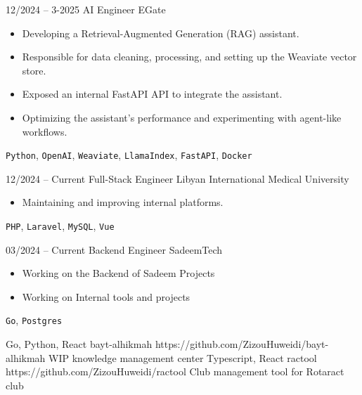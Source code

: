 \documentclass[9pt]{developercv} %
\begin{document}
\begin{entrylist}
    \entry
    {12/2024 -- 3-2025}
    {AI Engineer}
    {EGate}
    {\vspace{-10pt}
        \begin{itemize}[noitemsep,topsep=0pt,parsep=0pt,partopsep=0pt,leftmargin=-1pt]
            \item Developing a Retrieval-Augmented Generation (RAG) assistant.
            \item Responsible for data cleaning, processing, and setting up the Weaviate vector store.
            \item Exposed an internal FastAPI API to integrate the assistant.
            \item Optimizing the assistant's performance and experimenting with agent-like workflows.
        \end{itemize}
      \texttt{Python}, \texttt{OpenAI}, \texttt{Weaviate}, \texttt{LlamaIndex}, \texttt{FastAPI}, \texttt{Docker}}
        
    \entry
    {12/2024 -- Current}
    {Full-Stack Engineer}
    {Libyan International Medical University}
    {\vspace{-10pt}
        \begin{itemize}[noitemsep,topsep=0pt,parsep=0pt,partopsep=0pt,leftmargin=-1pt]
            \item Maintaining and improving internal platforms.
        \end{itemize}
        \texttt{PHP}, \texttt{Laravel}, \texttt{MySQL}, \texttt{Vue}}
    \entry
    {03/2024 -- Current}
    {Backend Engineer}
    {SadeemTech}
    {\vspace{-10pt}
        \begin{itemize}[noitemsep,topsep=0pt,parsep=0pt,partopsep=0pt,leftmargin=-1pt]
          \item Working on the Backend of Sadeem Projects
          \item Working on Internal tools and projects
        \end{itemize}
        \texttt{Go}, \texttt{Postgres}}
\end{entrylist}

\begin{entrylist}
	\entry
	{Go, Python, React}
	{bayt-alhikmah}
	{https://github.com/ZizouHuweidi/bayt-alhikmah}
	{WIP knowledge management center}
	\entry
	{Typescript, React}
	{ractool}
	{https://github.com/ZizouHuweidi/ractool}
	{Club management tool for Rotaract club}
\end{entrylist}
\end{document}
